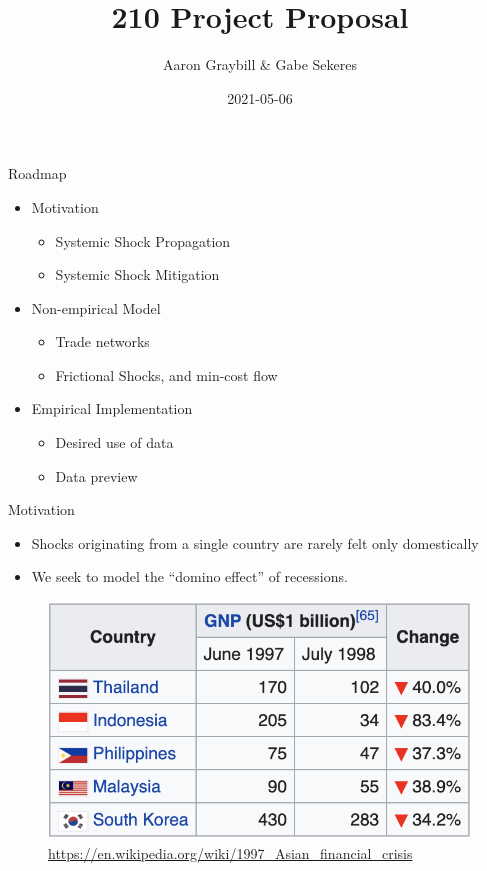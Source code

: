 \documentclass[
  ignorenonframetext,
]{beamer}
\title{210 Project Proposal}
\author{Aaron Graybill \& Gabe Sekeres}
\date{2021-05-06}
\providecommand{\tightlist}{%
  \setlength{\itemsep}{0pt}\setlength{\parskip}{0pt}}
\begin{document}
\frame{\titlepage}

\begin{frame}{Roadmap}
\protect\hypertarget{roadmap}{}

\begin{itemize}
\tightlist
\item
  Motivation

  \begin{itemize}
  \tightlist
  \item
    Systemic Shock Propagation
  \item
    Systemic Shock Mitigation
  \end{itemize}
\item
  Non-empirical Model

  \begin{itemize}
  \tightlist
  \item
    Trade networks
  \item
    Frictional Shocks, and min-cost flow
  \end{itemize}
\item
  Empirical Implementation

  \begin{itemize}
  \tightlist
  \item
    Desired use of data
  \item
    Data preview
  \end{itemize}
\end{itemize}

\end{frame}

\begin{frame}{Motivation}
\protect\hypertarget{motivation}{}

\begin{itemize}
\tightlist
\item
  Shocks originating from a single country are rarely felt only
  domestically
\item
  We seek to model the ``domino effect'' of recessions.
\end{itemize}

\begin{figure}
\centering
\includegraphics{AsianFinCrisis.png}
\caption{\url{https://en.wikipedia.org/wiki/1997_Asian_financial_crisis}}
\end{figure}

\end{frame}
\end{document}
